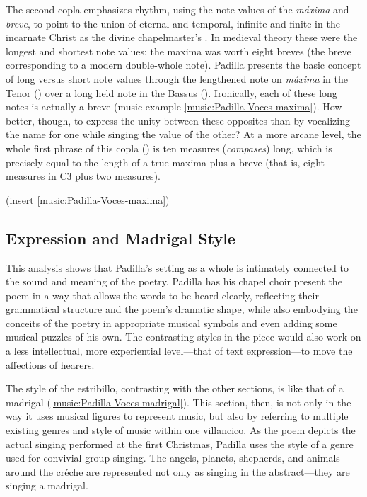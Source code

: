 The second copla emphasizes rhythm, using the note values of the \emph{máxima} and
\emph{breve}, to point to the union of eternal and temporal, infinite and finite in
the incarnate Christ as the divine chapelmaster's .
In medieval theory these were the longest and shortest note values: the maxima
was worth eight breves (the breve corresponding to a modern double-whole note).
Padilla presents the basic concept of long versus short note values through the
lengthened note on \emph{máxima} in the Tenor () over a long held note
in the Bassus ().
Ironically, each of these long notes is actually a breve (music example
\ref{music:Padilla-Voces-maxima}).
How better, though, to express the unity between these opposites than by
vocalizing the name for one while singing the value of the other?
At a more arcane level, the whole first phrase of this copla () is
ten measures (\emph{compases}) long, which is precisely equal to the length of a true
maxima plus a breve (that is, eight measures in C3 plus two measures).

(insert \cref{music:Padilla-Voces-maxima})
\label{music:Padilla-Voces-maxima}

\subsection{Expression and Madrigal Style}

This analysis shows that Padilla's setting as a whole is intimately connected to
the sound and meaning of the poetry.
Padilla has his chapel choir present the poem in a way that allows the words to
be heard clearly, reflecting their grammatical structure and the poem's dramatic
shape, while also embodying the conceits of the poetry in appropriate musical
symbols and even adding some musical puzzles of his own.
The contrasting styles in the piece would also work on a less intellectual, more
experiential level---that of text expression---to move the affections of hearers.

The style of the estribillo, contrasting with the other sections, is like
that of a madrigal (\cref{music:Padilla-Voces-madrigal}).
This section, then, is  not only in the way it uses musical
figures to represent music, but also by referring to multiple existing genres
and style of music within one villancico.
As the poem depicts the actual singing performed at the first Christmas, Padilla
uses the style of a genre used for convivial group singing.
The angels, planets, shepherds, and animals around the créche are represented
not only as singing in the abstract---they are singing a madrigal.

